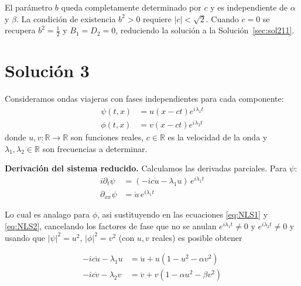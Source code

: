 \documentclass[letterpaper,11pt]{exam}
\theoremstyle{plain}
\begin{document}
El parámetro $b$ queda completamente determinado por $c$ y es independiente de $\alpha$ y $\beta$.
La condición de existencia $b^2 > 0$ requiere $|c| < \sqrt{2}$.
Cuando $c = 0$ se recupera $b^2 = \tfrac{1}{2}$ y $B_1 = D_2 = 0$, reduciendo la solución a la
Solución~\ref{sec:sol211}.


\section{Solución 3}

Consideramos ondas viajeras con fases independientes para cada componente:
\begin{align*}
    \psi(t,x)&=u(x-ct)e^{i\lambda_1t}\\
    \phi(t,x)&=v(x-ct)e^{i\lambda_2t}
    \label{eq:ansatz3}
\end{align*}
donde $u,v:\mathbb{R}\to\mathbb{R}$ son funciones reales, $c\in\mathbb{R}$ es la velocidad de la onda
y $\lambda_1,\lambda_2\in\mathbb{R}$ son frecuencias a determinar.

\medskip
\noindent\textbf{Derivación del sistema reducido.}
Calculamos las derivadas parciales. Para $\psi$:
\begin{align*}
    i\partial_t\psi &= (-ic\dot{u} - \lambda_1 u)\,e^{i\lambda_1 t} \\
    \partial_{xx}\psi &= \ddot{u}\,e^{i\lambda_1 t}
\end{align*}

Lo cual es analago para $\phi$, asi sustituyendo en las ecuaciones \eqref{eq:NLS1} y \eqref{eq:NLS2}, cancelando los factores de fase que no se anulan $e^{i\lambda_1 t}\neq 0$ y $e^{i\lambda_2 t}\neq 0$ y usando que $|\psi|^2=u^2$, $|\phi|^2=v^2$ (con $u,v$ reales) es posible obtener


\begin{align}
    -ic\dot{u}-\lambda_1u&=\ddot{u}+u(1-u^2-\alpha v^2) \label{eq:u_sol3.1}\\
    -ic\dot{v}-\lambda_2v&=\ddot{v}+v(1-\alpha u^2-\beta v^2) \label{eq:v_sol3.2}
\end{align}
\end{document}
